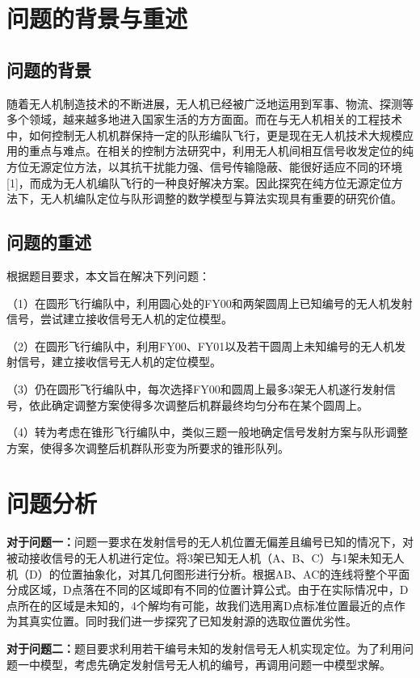 \documentclass{ctexart}
\begin{document}
\section{问题的背景与重述}
\subsection{问题的背景}
随着无人机制造技术的不断进展，无人机已经被广泛地运用到军事、物流、探测等多个领域，越来越多地进入国家生活的方方面面。而在与无人机相关的工程技术中，如何控制无人机机群保持一定的队形编队飞行，更是现在无人机技术大规模应用的重点与难点。在相关的控制方法研究中，利用无人机间相互信号收发定位的纯方位无源定位方法，以其抗干扰能力强、信号传输隐蔽、能很好适应不同的环境[1]，而成为无人机编队飞行的一种良好解决方案。因此探究在纯方位无源定位方法下，无人机编队定位与队形调整的数学模型与算法实现具有重要的研究价值。

\subsection{问题的重述}
根据题目要求，本文旨在解决下列问题：

（1）在圆形飞行编队中，利用圆心处的FY00和两架圆周上已知编号的无人机发射信号，尝试建立接收信号无人机的定位模型。

（2）在圆形飞行编队中，利用FY00、FY01以及若干圆周上未知编号的无人机发射信号，建立接收信号无人机的定位模型。

（3）仍在圆形飞行编队中，每次选择FY00和圆周上最多3架无人机遂行发射信号，依此确定调整方案使得多次调整后机群最终均匀分布在某个圆周上。

（4）转为考虑在锥形飞行编队中，类似三题一般地确定信号发射方案与队形调整方案，使得多次调整后机群队形变为所要求的锥形队列。

\section{问题分析}
\textbf{对于问题一：}问题一要求在发射信号的无人机位置无偏差且编号已知的情况下，对被动接收信号的无人机进行定位。将3架已知无人机（A、B、C）与1架未知无人机（D）的位置抽象化，对其几何图形进行分析。根据AB、AC的连线将整个平面分成区域，D点落在不同的区域即有不同的位置计算公式。由于在实际情况中，D点所在的区域是未知的，4个解均有可能，故我们选用离D点标准位置最近的点作为其真实位置。同时我们进一步探究了已知发射源的选取位置优劣性。

\textbf{对于问题二：}题目要求利用若干编号未知的发射信号无人机实现定位。为了利用问题一中模型，考虑先确定发射信号无人机的编号，再调用问题一中模型求解。
\end{document}
